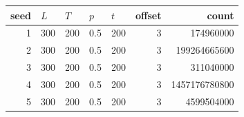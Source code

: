 \begin{tabular}{rllllrr}%
\hline%
\textbf{seed}&$L$&$T$&$p$&$t$&\textbf{offset}&\textbf{count}\\%
\hline%
1&300&200&0.5&200&3&174960000\\%
2&300&200&0.5&200&3&199264665600\\%
3&300&200&0.5&200&3&311040000\\%
4&300&200&0.5&200&3&1457176780800\\%
5&300&200&0.5&200&3&4599504000\\%
\hline%
\end{tabular}
